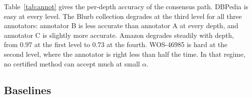 \documentclass[preprint,12pt]{elsarticle}
\theoremstyle{definition}
\begin{document}
Table~\ref{tab:annot} gives the per-depth accuracy of the consensus path.
DBPedia is easy at every level. The Blurb collection degrades at the third
level for all three annotators: annotator B is less accurate than annotator A at
every depth, and annotator C is slightly more accurate. Amazon degrades steadily with depth, from
$0.97$ at the first level to $0.73$ at the fourth. WOS-46985 is hard at the
second level, where the annotator is right less than half the time. In that
regime, no certified method can accept much at small $\alpha$.

\begin{table}[!tbp]
\centering
\caption{Accuracy of the consensus path by depth. Annotator A is
\texttt{deepseek-chat}, annotator B is \texttt{claude-haiku-4-5} and annotator C
is \texttt{gpt-5.6-luna}.}
\label{tab:annot}

\end{table}

\subsection{Baselines}
\label{sec:setup-base}
\end{document}
